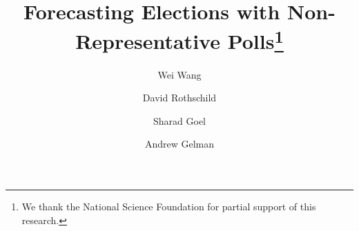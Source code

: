 \documentclass[preprint,authoryear,12pt]{elsarticle}
\begin{document}
\begin{frontmatter}



\title{Forecasting Elections with Non-Representative Polls\footnote{We
    thank the National Science Foundation for partial support of this research.}}



\author[col]{Wei Wang}


\author[msr]{David Rothschild}


\author[msr]{Sharad Goel}


\author[col,poly]{Andrew Gelman}

\address[col]{Department of Statistics, Columbia University, New York, NY, USA}
\address[msr]{Microsoft Research, New York, NY, USA}
\address[poly]{Department of Political Science, Columbia University, New York, NY, USA}


\end{frontmatter}
\end{document}
